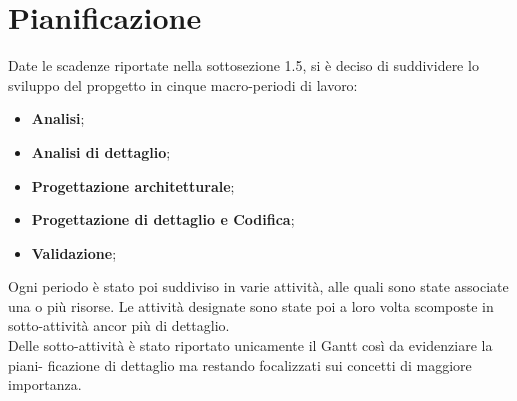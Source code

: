 \documentclass[../PianoDiProgetto.tex]{subfiles}
\begin{document}
	\section{Pianificazione}
	Date le scadenze riportate nella sottosezione 1.5, si è deciso di suddividere lo sviluppo del propgetto in cinque macro-periodi di lavoro:
	\begin{itemize}
		\item \textbf{Analisi};
		\item \textbf{Analisi di dettaglio};
		\item \textbf{Progettazione architetturale};
		\item \textbf{Progettazione di dettaglio e Codifica};
		\item \textbf{Validazione};
	\end{itemize}
	Ogni periodo è stato poi suddiviso in varie attività, alle quali sono state associate una o
	più risorse. Le attività designate sono state poi a loro volta scomposte in sotto-attività
	ancor più di dettaglio. \\
	Delle sotto-attività è stato riportato unicamente il Gantt così da evidenziare la piani-
	ficazione di dettaglio ma restando focalizzati sui concetti di maggiore importanza.
	
\end{document}
